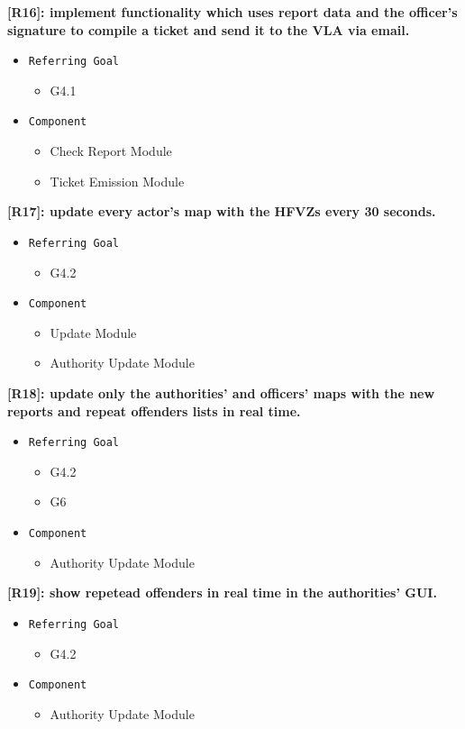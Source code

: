 \documentclass[12pt,a4paper]{article}
\begin{document}
\textbf{[R16]: implement functionality which uses report data and the officer's signature to compile a ticket and send it to the VLA via email.}
\begin{itemize}
	\item \texttt{Referring Goal}
	\begin{itemize}
		\item G4.1
	\end{itemize}
	\item \texttt{Component}
	\begin{itemize}
		\item Check Report Module
		\item Ticket Emission Module
	\end{itemize}
\end{itemize}
\textbf{[R17]: update every actor's map with the HFVZs every 30 seconds.}
\begin{itemize}
	\item \texttt{Referring Goal}
	\begin{itemize}
		\item G4.2
	\end{itemize}
	\item \texttt{Component}
	\begin{itemize}
		\item Update Module
		\item Authority Update Module 
	\end{itemize}
\end{itemize}
\textbf{[R18]: update only the authorities' and officers' maps with the new reports and repeat offenders lists in real time.}
\begin{itemize}
	\item \texttt{Referring Goal}
	\begin{itemize}
		\item G4.2
		\item G6
	\end{itemize}
	\item \texttt{Component}
	\begin{itemize}
		\item Authority Update Module 
	\end{itemize}
\end{itemize}
\textbf{[R19]: show repetead offenders in real time in the authorities' GUI.}
\begin{itemize}
	\item \texttt{Referring Goal}
	\begin{itemize}
		\item G4.2
	\end{itemize}
	\item \texttt{Component}
	\begin{itemize}
		\item Authority Update Module 
	\end{itemize}
\end{itemize}
\end{document}
